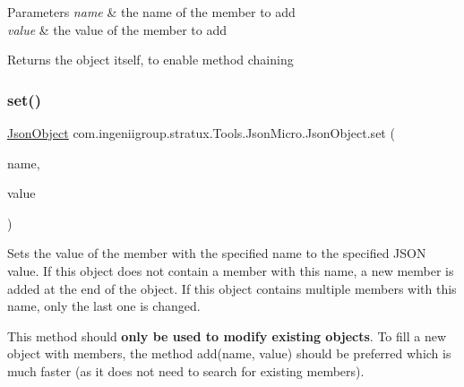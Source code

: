 \begin{DoxyParams}{Parameters}
{\em name} & the name of the member to add \\
\hline
{\em value} & the value of the member to add \\
\hline
\end{DoxyParams}
\begin{DoxyReturn}{Returns}
the object itself, to enable method chaining 
\end{DoxyReturn}
\mbox{\label{classcom_1_1ingeniigroup_1_1stratux_1_1_tools_1_1_json_micro_1_1_json_object_a55687de1e822deb18c01b0292084e4ff}} 
\subsubsection{\texorpdfstring{set()}{set()}\hspace{0.1cm}{\footnotesize\ttfamily [7/7]}}
{\footnotesize\ttfamily \hyperlink{classcom_1_1ingeniigroup_1_1stratux_1_1_tools_1_1_json_micro_1_1_json_object}{Json\+Object} com.\+ingeniigroup.\+stratux.\+Tools.\+Json\+Micro.\+Json\+Object.\+set (\begin{DoxyParamCaption}\item[{String}]{name,  }\item[{\hyperlink{classcom_1_1ingeniigroup_1_1stratux_1_1_tools_1_1_json_micro_1_1_json_value}{Json\+Value}}]{value }\end{DoxyParamCaption})}

Sets the value of the member with the specified name to the specified J\+S\+ON value. If this object does not contain a member with this name, a new member is added at the end of the object. If this object contains multiple members with this name, only the last one is changed. 

This method should {\bfseries only be used to modify existing objects}. To fill a new object with members, the method {\ttfamily add(name, value)} should be preferred which is much faster (as it does not need to search for existing members). 


